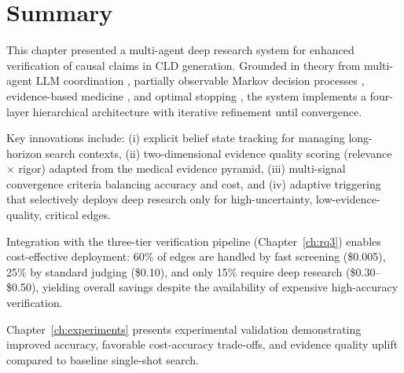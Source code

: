 \section{Summary}

This chapter presented a multi-agent deep research system for enhanced verification of causal claims in CLD generation. Grounded in theory from multi-agent LLM coordination \citep{li2023theory, smith2025organizational}, partially observable Markov decision processes \citep{pomdp_primer}, evidence-based medicine \citep{evidence_pyramid_pmc}, and optimal stopping \citep{deep_rl_optimal_stopping}, the system implements a four-layer hierarchical architecture with iterative refinement until convergence.

Key innovations include: (i) explicit belief state tracking for managing long-horizon search contexts, (ii) two-dimensional evidence quality scoring (relevance $\times$ rigor) adapted from the medical evidence pyramid, (iii) multi-signal convergence criteria balancing accuracy and cost, and (iv) adaptive triggering that selectively deploys deep research only for high-uncertainty, low-evidence-quality, critical edges.

Integration with the three-tier verification pipeline (Chapter~\ref{ch:rq3}) enables cost-effective deployment: 60\% of edges are handled by fast screening (\$0.005), 25\% by standard judging (\$0.10), and only 15\% require deep research (\$0.30--\$0.50), yielding overall savings despite the availability of expensive high-accuracy verification.

Chapter~\ref{ch:experiments} presents experimental validation demonstrating improved accuracy, favorable cost-accuracy trade-offs, and evidence quality uplift compared to baseline single-shot search.
